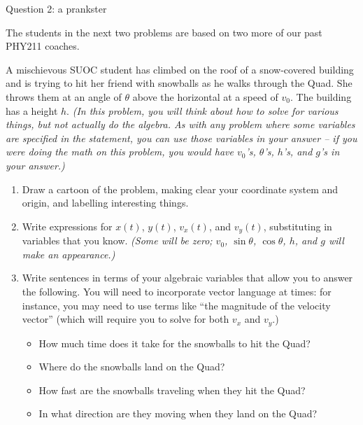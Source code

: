 \documentclass[12pt]{article}
\newcommand{\BI}{\begin{itemize}}
\newcommand{\EI}{\end{itemize}}
\begin{document}
\newpage

\centerline{\Large Question 2: a prankster}     

\footnotesize

\it \begin{center} The students in the next two problems are based on two more of our past PHY211 coaches.\end{center}

\normalsize \bigskip\rm

A mischievous SUOC student has climbed on the roof of a snow-covered building and is trying to hit her friend with snowballs as he walks through the Quad. 
She throws them at an angle of $\theta$ above the horizontal at a speed of $v_0$. 
The building has a height $h$. {\it (In this problem, you will think about how to solve for various things, but not actually do the algebra. As with any problem where some variables are specified in the statement, you can use
	those variables in your answer -- if you were doing the math on this problem, you would have $v_0$'s, $\theta$'s, $h$'s, and $g$'s in your answer.)}

\begin{enumerate}

\item Draw a cartoon of the problem, making clear your coordinate system and origin, and
labelling interesting things.

\vspace{2in}

\item Write expressions for $x(t)$, $y(t)$, $v_x(t)$, and $v_y(t)$, substituting in variables that you know. {\it (Some will be zero; $v_0$, $\sin \theta$, $\cos \theta$, $h$, and $g$ will make an appearance.)}


\newpage
\item Write sentences in terms of your algebraic variables that allow you to answer the following. You  
will need to incorporate vector language at times: for instance, you may need to use terms like ``the magnitude of the
velocity vector'' (which will require you to solve for both $v_x$ and $v_y$.)

\BI
\item How much time does it take for the snowballs to hit the Quad?

\vspace{1.5in}

\item Where do the snowballs land on the Quad?

\vspace{1.5in}
\item How fast are the snowballs traveling when they hit the Quad?

\vspace{1.5in}
\item In what direction are they moving when they land on the Quad?
\EI
\end{enumerate}
\end{document}
